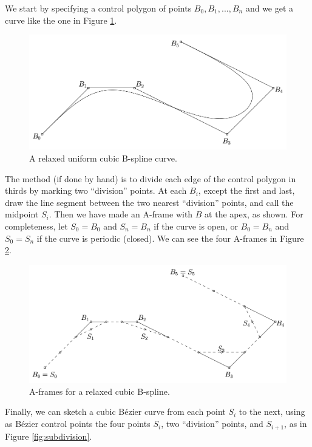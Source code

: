 \documentclass[]{usiinfbachelorproject}
\begin{document}
\noindent We start by specifying a control polygon of points $B_0, B_1, ... ,B_n$ and we get a curve like the one in Figure \ref{fig:points}.

\begin{figure}[ht]
	\centering
	\includegraphics[width=1\textwidth]{img/spline_points1.png}
	\caption{A relaxed uniform cubic B-spline curve.}
	\label{fig:points}
\end{figure}

\noindent The method (if done by hand) is to divide each edge of the control polygon in thirds by marking two ``division'' points. At each $B_i$, except the first and last, draw the line segment between the two nearest ``division'' points, and call the midpoint $S_i$. Then we have made an A-frame with $B$ at the apex, as shown. For completeness, let $S_0 = B_0$ and $S_n = B_n$ if the curve is open, or $B_0=B_n$ and $S_0=S_n$ if the curve is periodic (closed). We can see the four A-frames in Figure \ref{fig:aframes}.

\begin{figure}[ht]
	\centering
	\includegraphics[width=1\textwidth]{img/spline_points2.png}
	\caption{A-frames for a relaxed cubic B-spline.}
	\label{fig:aframes}
\end{figure}

\noindent Finally, we can sketch a cubic B\'ezier curve from each point $S_i$ to the next, using as B\'ezier control points the four points $S_i$, two ``division'' points, and $S_{i+1}$, as in Figure \ref{fig:subdivision}.
\end{document}
